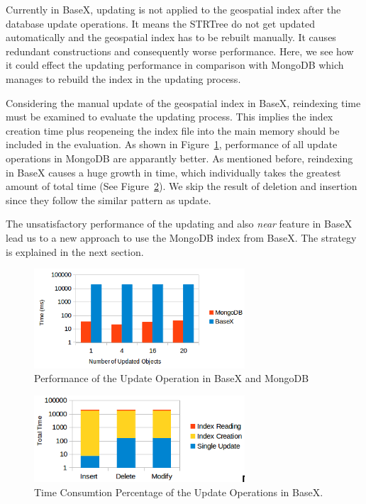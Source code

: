 \documentclass[a4paper,12pt]{article}
\begin{document}
Currently in BaseX, updating is not applied to the geospatial index after the database update operations. It means the STRTree do not get updated automatically and the geospatial index has to be rebuilt manually. It causes redundant constructions and consequently worse performance. Here, we see how it could effect the updating performance in comparison with MongoDB which manages to rebuild the index in the updating process.

Considering the manual update of the geospatial index in BaseX, reindexing time must be examined to evaluate the updating process. This implies the index creation time plus reopeneing the index file into the main memory should be included in the evaluation. 
As shown in Figure~\ref{figBXvsMongoUpdate}, performance of all update operations in MongoDB are apparantly better. As mentioned before, reindexing in BaseX causes a huge growth in time, which individually takes the greatest amount of total time (See Figure~\ref{figBXUpdate}). We skip the result of deletion and insertion since they follow the similar pattern as update.

The unsatisfactory performance of the updating and also \textit{near} feature in BaseX lead us to a new approach to use the MongoDB index from BaseX. The strategy is explained in the next section.

 


\begin{figure}
\centering
\includegraphics[width=0.7\textwidth]{BXvsMongo-Update.png}
\caption{Performance of the Update Operation in BaseX and MongoDB}
\label{figBXvsMongoUpdate}
\end{figure}


\begin{figure}
\centering
\includegraphics[width=0.7\textwidth]{BXUpdate.png}
\caption{Time Consumtion Percentage of the Update Operations in BaseX.}
\label{figBXUpdate}
\end{figure}
\end{document}
